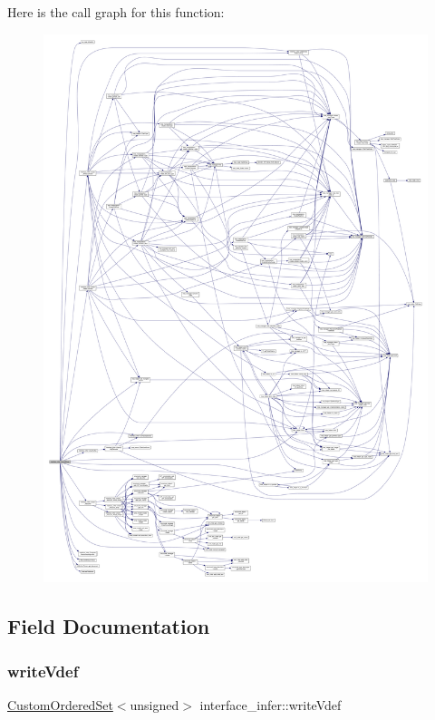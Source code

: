 Here is the call graph for this function\+:
\nopagebreak
\begin{figure}[H]
\begin{center}
\leavevmode
\includegraphics[width=350pt]{d9/d8a/classinterface__infer_ac613f0dc15f8116799a922fc7fbd726a_cgraph}
\end{center}
\end{figure}


\subsection{Field Documentation}
\mbox{\label{classinterface__infer_a4b46febd5b45bd3d489232eb93873e66}} 
\subsubsection{\texorpdfstring{write\+Vdef}{writeVdef}}
{\footnotesize\ttfamily \hyperlink{classCustomOrderedSet}{Custom\+Ordered\+Set}$<$unsigned$>$ interface\+\_\+infer\+::write\+Vdef\hspace{0.3cm}{\ttfamily [private]}}



